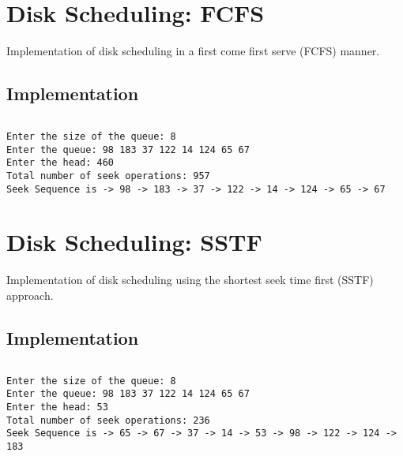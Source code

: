 \pagebreak

\section{Disk Scheduling: FCFS}
\label{sec:disk-fcfs}

Implementation of disk scheduling in a
first come first serve (FCFS) manner.

\subsection{Implementation}

\inputminted[fontsize=\footnotesize,autogobble]{c}{code/disk_fcfs.c}

\begin{lstlisting}[style=output]
Enter the size of the queue: 8
Enter the queue: 98 183 37 122 14 124 65 67
Enter the head: 460
Total number of seek operations: 957
Seek Sequence is -> 98 -> 183 -> 37 -> 122 -> 14 -> 124 -> 65 -> 67
\end{lstlisting}


\section{Disk Scheduling: SSTF}
\label{sec:disk-sstf}

Implementation of disk scheduling using the
shortest seek time first (SSTF) approach.

\subsection{Implementation}

\inputminted[fontsize=\footnotesize,autogobble]{c}{code/disk_sstf.c}

\begin{lstlisting}[style=output]
Enter the size of the queue: 8
Enter the queue: 98 183 37 122 14 124 65 67
Enter the head: 53
Total number of seek operations: 236
Seek Sequence is -> 65 -> 67 -> 37 -> 14 -> 53 -> 98 -> 122 -> 124 -> 183
\end{lstlisting}
